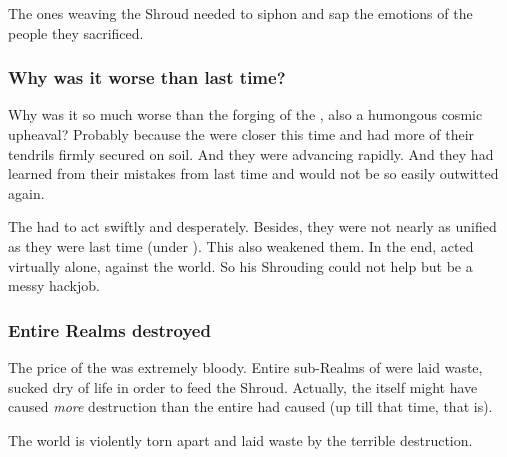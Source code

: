 The ones weaving the Shroud needed to siphon and sap the emotions of the people they sacrificed. 






\subsubsection{Why was it worse than last time?}
Why was it so much worse than the forging of the , also a humongous cosmic upheaval? 
Probably because the \banes{} were closer this time and had more of their tendrils firmly secured on \Miithian{} soil. 
And they were advancing rapidly. 
And they had learned from their mistakes from last time and would not be so easily outwitted again. 

The \dragons{} had to act swiftly and desperately. 
Besides, they were not nearly as unified as they were last time (under \Kserasshana). 
This also weakened them. 
In the end, \QuessanthIshnaruchaefir{} acted virtually alone, against the world. 
So his Shrouding could not help but be a messy hackjob. 





\subsubsection{Entire Realms destroyed}
The price of the \SecondShrouding{} was extremely bloody. 
Entire sub-Realms of \Miith{} were laid waste, sucked dry of life in order to feed the Shroud. 
Actually, the \SecondShrouding{} itself might have caused \emph{more} destruction than the entire \secondbanewar{} had caused (up till that time, that is).

The world is violently torn apart and laid waste by the terrible destruction. 


